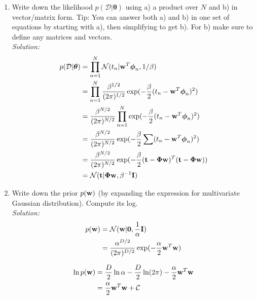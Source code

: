 \documentclass[12pt,a4paper]{article}
\newcommand{\Data}{\mathcal{D}}
\newcommand{\DataIndex}{n}
\newcommand{\eye}{{\bf I}}
\newcommand{\tscalar}{t}
\newcommand{\tvec}{{\bf \tscalar}}
\newcommand{\wscalar}{w}
\newcommand{\wvec}{{\bf \wscalar}}
\newcommand{\tn}{\tscalar_{\DataIndex}}
\newcommand{\zerovec}{ {\bf 0}}
\newcommand{\thetavec}{\boldsymbol{\theta}}
\newcommand{\thetav}{\thetavec}
\newcommand{\phivec}{\boldsymbol{\phi}}
\newcommand{\Phimat}{\boldsymbol{\Phi}}
\newcommand{\phivecn}{\phivec_{\DataIndex}}
\begin{document}
\begin{enumerate}
  \item Write down the likelihood $p(\Data | \thetav)$ using a) a product over $N$ and b) in vector/matrix form.    Tip: You can answer both a) and b) in one set of equations by starting with a), then simplifying to get b).  For b) make sure to define any matrices and vectors. \\
	  \emph{Solution:} \\
		  \begin{align*}
		  p(\Data | \thetav) &= \prod_{n=1}^{N} \mathcal{N}(\tn| \wvec^T \phivecn, 1 / \beta) \\
		  &=  \prod_{n=1}^{N} \frac{\beta^{1/2}}{(2\pi)^{1/2}} \exp (-\frac{\beta}{2}(\tn- \wvec^T \phivecn)^2)\\
		  &=  \frac{\beta^{N/2}}{(2\pi)^{N/2}} \prod_{n=1}^{N} \exp (-\frac{\beta}{2}(\tn- \wvec^T \phivecn)^2)\\    
		  &=  \frac{\beta^{N/2}}{(2\pi)^{N/2}} \exp (-\frac{\beta}{2}\sum(\tn - \wvec^T \phivecn)^2)\\    
		  &=  \frac{\beta^{N/2}}{(2\pi)^{N/2}} \exp (-\frac{\beta}{2}(\tvec - \Phimat \wvec)^T(\tvec - \Phimat \wvec))\\
		  &=\mathcal{N}(\tvec | \Phimat \wvec, \beta^{-1} \eye )
		  \end{align*}
	  
  \item Write down the prior $p(\wvec)$ (by expanding the expression for multivariate Gaussian distribution).  Compute its log.\\
	  \emph{Solution:} \\
		  \begin{align*}
		  	p(\wvec) &= \mathcal{N}(\wvec | \zerovec, \frac{1}{\alpha}\eye) \\
		  	&= \frac{\alpha^{D/2}}{(2\pi)^{D/2}} \exp (- \frac{\alpha}{2} \wvec^T \wvec)
		  \end{align*}
		  
		  \begin{align*}
		  	\ln p(\wvec) &= \frac{D}{2} \ln \alpha - \frac{D}{2} \ln (2 \pi) - \frac{\alpha}{2}\wvec^T \wvec \\
		  	&= \frac{\alpha}{2} \wvec^T \wvec + \mathcal{C}
		  \end{align*} 
  

\end{enumerate}
\end{document}
